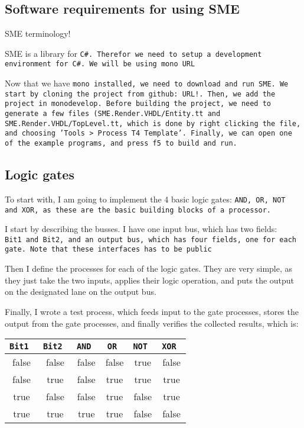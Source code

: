 \subsection{Software requirements for using SME}
SME terminology!

SME is a library for \tt{C\#}. Therefor we need to setup a development
environment for \tt{C\#}. We will be using \tt{mono} URL %

Now that we have \tt{mono} installed, we need to download and run \tt{SME}. We
start by cloning the project from github: URL!. %
Then, we add the project in
\tt{monodevelop}. Before building the project, we need to generate a few files
(\tt{SME.Render.VHDL/Entity.tt} and \tt{SME.Render.VHDL/TopLevel.tt},
which is done by right clicking the file, and choosing 'Tools > Process T4
Template'. Finally, we can open one of the example programs, and press f5 to
build and run.


\subsection{Logic gates}
To start with, I am going to implement the 4 basic logic gates: \tt{AND},
\tt{OR}, \tt{NOT} and \tt{XOR}, as these are the basic building blocks of a
processor.

I start by describing the busses. I have one input bus, which has two fields:
\tt{Bit1} and \tt{Bit2}, and an output bus, which has four fields, one for each
gate. Note that these interfaces has to be public

Then I define the processes for each of the logic gates. They are very simple,
as they just take the two inputs, applies their logic operation, and puts the
output on the designated lane on the output bus.
%

Finally, I wrote a test process, which feeds input to the gate processes,
stores the output from the gate processes, and finally verifies the collected
results, which is:
\begin{tabular}{cc|cccc}
    \tt{Bit1} & \tt{Bit2} & \tt{AND} & \tt{OR} & \tt{NOT} & \tt{XOR} \\
    \hline
    false     & false     & false    & false   & true     & false \\
    false     & true      & false    & true    & true     & true  \\
    true      & false     & false    & true    & false    & true  \\
    true      & true      & true     & true    & false    & false \\
    \hline
\end{tabular}
%

